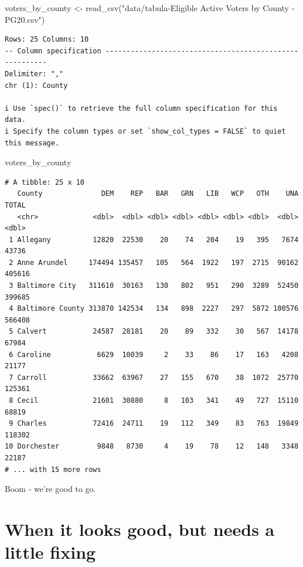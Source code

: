 \documentclass[
  letterpaper,
  DIV=11,
  numbers=noendperiod]{scrreprt}
\newenvironment{Shaded}{\begin{snugshade}}{\end{snugshade}}
\newcommand{\FunctionTok}[1]{\textcolor[rgb]{0.28,0.35,0.67}{#1}}
\newcommand{\NormalTok}[1]{\textcolor[rgb]{0.00,0.23,0.31}{#1}}
\newcommand{\OtherTok}[1]{\textcolor[rgb]{0.00,0.23,0.31}{#1}}
\newcommand{\StringTok}[1]{\textcolor[rgb]{0.13,0.47,0.30}{#1}}
\begin{document}
\begin{Shaded}
\begin{Highlighting}[]
\NormalTok{voters\_by\_county }\OtherTok{\textless{}{-}} \FunctionTok{read\_csv}\NormalTok{(}\StringTok{"data/tabula{-}Eligible Active Voters by County {-} PG20.csv"}\NormalTok{)}
\end{Highlighting}
\end{Shaded}

\begin{verbatim}
Rows: 25 Columns: 10
-- Column specification --------------------------------------------------------
Delimiter: ","
chr (1): County

i Use `spec()` to retrieve the full column specification for this data.
i Specify the column types or set `show_col_types = FALSE` to quiet this message.
\end{verbatim}

\begin{Shaded}
\begin{Highlighting}[]
\NormalTok{voters\_by\_county}
\end{Highlighting}
\end{Shaded}

\begin{verbatim}
# A tibble: 25 x 10
   County              DEM    REP   BAR   GRN   LIB   WCP   OTH    UNA  TOTAL
   <chr>             <dbl>  <dbl> <dbl> <dbl> <dbl> <dbl> <dbl>  <dbl>  <dbl>
 1 Allegany          12820  22530    20    74   204    19   395   7674  43736
 2 Anne Arundel     174494 135457   105   564  1922   197  2715  90162 405616
 3 Baltimore City   311610  30163   130   802   951   290  3289  52450 399685
 4 Baltimore County 313870 142534   134   898  2227   297  5872 100576 566408
 5 Calvert           24587  28181    20    89   332    30   567  14178  67984
 6 Caroline           6629  10039     2    33    86    17   163   4208  21177
 7 Carroll           33662  63967    27   155   670    38  1072  25770 125361
 8 Cecil             21601  30880     8   103   341    49   727  15110  68819
 9 Charles           72416  24711    19   112   349    83   763  19849 118302
10 Dorchester         9848   8730     4    19    78    12   148   3348  22187
# ... with 15 more rows
\end{verbatim}

Boom - we're good to go.

\hypertarget{when-it-looks-good-but-needs-a-little-fixing}{%
\section{When it looks good, but needs a little
fixing}\label{when-it-looks-good-but-needs-a-little-fixing}}
\end{document}
